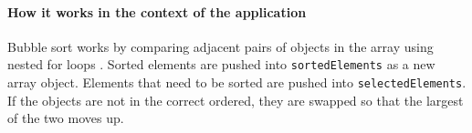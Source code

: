 \paragraph{How it works in the context of the application}
Bubble sort works by comparing adjacent pairs of objects in the array using nested for loops \cite{bubble_sort_geeks}. Sorted elements are pushed into \lstinline{sortedElements} as a new array object. Elements that need to be sorted are pushed into \lstinline{selectedElements}. If the objects are not in the correct ordered, they are swapped so that the largest of the two moves up.



